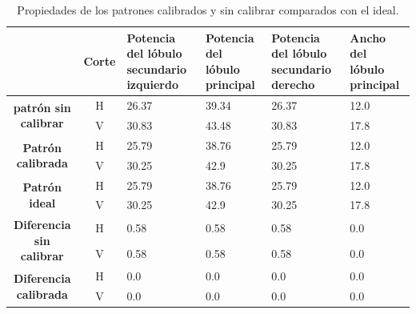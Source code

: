 \begin{table}[H]
  \footnotesize
  \centering
  \begin{tabular}{|c|c|p{2cm}|p{2cm}|p{2cm}|p{2cm}|}
    \cline{2-6}
    \multicolumn{1}{c|}{} & \textbf{Corte} & \textbf{Potencia del lóbulo secundario izquierdo} & \textbf{Potencia del lóbulo principal} &
    \textbf{Potencia del lóbulo secundario derecho} & \textbf{Ancho del lóbulo principal} \tabularnewline\hline
    \multirow{2}{*}{\textbf{patrón sin calibrar}} & H & 26.37 & 39.34 & 26.37 & 12.0 \tabularnewline\cline{2-6}
     & V & 30.83 & 43.48 & 30.83 & 17.8 \tabularnewline\hline
    \multirow{2}{*}{\textbf{Patrón calibrada}} & H & 25.79 & 38.76 & 25.79 & 12.0 \tabularnewline\cline{2-6}
     & V & 30.25 & 42.9 & 30.25 & 17.8 \tabularnewline\hline
    \multirow{2}{*}{\textbf{Patrón ideal}} & H & 25.79 & 38.76 & 25.79 & 12.0 \tabularnewline\cline{2-6}
     & V & 30.25 & 42.9 & 30.25 & 17.8 \tabularnewline\hline
    \multirow{2}{*}{\textbf{Diferencia sin calibrar}} & H & 0.58 & 0.58 & 0.58 & 0.0\tabularnewline\cline{2-6}
     & V & 0.58 & 0.58 & 0.58 & 0.0 \tabularnewline\hline
    \multirow{2}{*}{\textbf{Diferencia calibrada}} & H & 0.0 & 0.0 & 0.0 & 0.0 \tabularnewline\cline{2-6}
     & V & 0.0 & 0.0 & 0.0 & 0.0 \tabularnewline\hline
  \end{tabular}
  \caption{Propiedades de los patrones calibrados y sin calibrar comparados con el ideal.}
  \label{tab:wallErrClassical10degRow}
\end{table}


